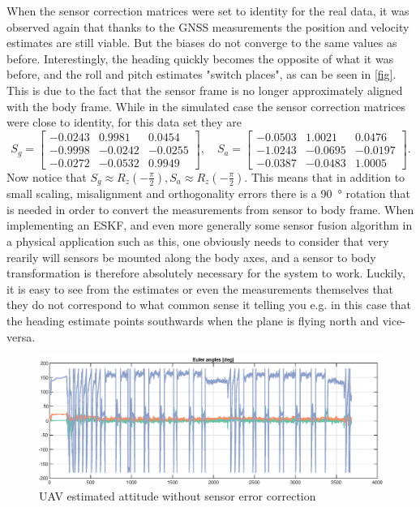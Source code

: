 When the sensor correction matrices were set to identity for the real data, it was observed again that thanks to the GNSS measurements the position and velocity estimates are still viable. But the biases do not converge to the same values as before. Interestingly, the heading quickly becomes the opposite of what it was before, and the roll and pitch estimates "switch places", as can be seen in \cref{fig}. This is due to the fact that the sensor frame is no longer approximately aligned with the body frame. While in the simulated case the sensor correction matrices were close to identity, for this data set they are
\begin{equation}
    S_g = \begin{bmatrix}
        -0.0243 & 0.9981  & 0.0454 \\
        -0.9998 & -0.0242 & -0.0255 \\
        -0.0272 & -0.0532 & 0.9949
    \end{bmatrix}, \quad
    S_a = \begin{bmatrix}
        -0.0503 & 1.0021  & 0.0476 \\
        -1.0243 & -0.0695 & -0.0197 \\
        -0.0387 & -0.0483 & 1.0005
    \end{bmatrix}.
\end{equation}
Now notice that $S_g \approx R_z(-\frac{\pi}{2}), S_a \approx R_z(-\frac{\pi}{2})$. This means that in addition to small scaling, misalignment and orthogonality errors there is a \SI{90}{\degree} rotation that is needed in order to convert the measurements from sensor to body frame. When implementing an ESKF, and even more generally some sensor fusion algorithm in a physical application such as this, one obviously needs to consider that very rearily will sensors be mounted along the body axes, and a sensor to body transformation is therefore absolutely necessary for the system to work. Luckily, it is easy to see from the estimates or even the measurements themselves that they do not correspond to what common sense it telling you e.g. in this case that the heading estimate points southwards when the plane is flying north and vice-versa. 

\begin{figure}[!htb]
    \centering
    \includegraphics[width=0.8\linewidth]{figures/ga_2/real_bad_heading.eps}
    \caption{UAV estimated attitude without sensor error correction}
    \label{fig:ga_2_real_consistency}
\end{figure}

